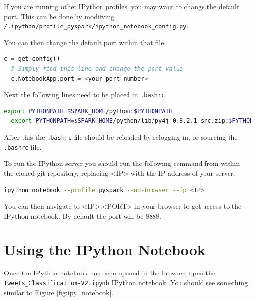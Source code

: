 If you are running other IPython profiles, you may want to change the default port. This can be done by modifying \texttt{\texttildelow/.ipython/profile\_pyspark/ipython\_notebook\_config.py}.

You can then change the default port within that file.
\begin{lstlisting}[language=python]
  c = get_config()
  # Simply find this line and change the port value
  c.NotebookApp.port = <your port number>
\end{lstlisting}

Next the following lines need to be placed in \texttt{.bashrc}.
\begin{lstlisting}[language=bash]
  export PYTHONPATH=$SPARK_HOME/python:$PYTHONPATH
  export PYTHONPATH=$SPARK_HOME/python/lib/py4j-0.8.2.1-src.zip:$PYTHONPATH
\end{lstlisting}

After this the \texttt{.bashrc} file should be reloaded by relogging in, or sourcing the \texttt{.bashrc} file.

To run the IPython server you should run the following command from within the cloned git repository, replacing <IP> with the IP address of your server.
\begin{lstlisting}[language=bash]
  ipython notebook --profile=pyspark --no-browser --ip <IP>
\end{lstlisting}

You can then navigate to <IP>:<PORT> in your browser to get access to the IPython notebook. By default the port will be 8888.

\section{Using the IPython Notebook}

Once the IPython notebook has been opened in the browser, open the \texttt{Tweets\_Classification-V2.ipynb} IPython notebook. You should see something similar to Figure \ref{fig:ipy_notebook}.

